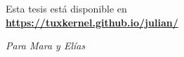 \documentclass[14pt,twoside,final]{extbook} %
\begin{document}
\setcounter{page}{1} %
\parindent=5mm %
\parskip=0mm %
\newcommand{\nota}[1]{\marginpar{\color{blue}\tiny #1}} %
\newpage
\pagestyle{empty}

\newpage
\pagestyle{empty}
\null\vfill
{
\noindent\footnotesize Esta tesis está disponible en \faGithub \\

\noindent\footnotesize\textbf{\url{https://tuxkernel.github.io/julian/}}
}
\newpage
\pagestyle{empty}
\hspace*{0pt}
\vspace*{42pt}
\begin{flushright}
\textit{Para Mara y Elías} 
\end{flushright}
\newpage
\pagestyle{empty}
\null\vfill
\end{document}
